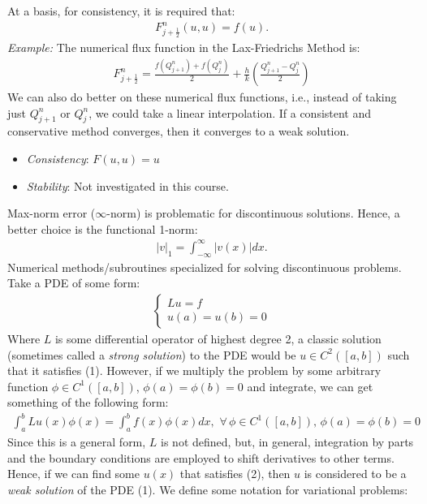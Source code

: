 \documentclass{article}
\begin{document}
At a basis, for consistency, it is required that:
\begin{align*}
  F_{j + \frac{1}{2}}^n (u, u) = f(u).
\end{align*}
\textit{Example:} The numerical flux function in the Lax-Friedrichs Method is:
\begin{align*}
  F_{j+\frac{1}{2}}^n = \frac{f(Q_{j+1}^n) + f(Q_j^n)}{2} + \frac{h}{k} \left(\frac{Q_{j + 1}^n - Q_j^n}{2}\right)
\end{align*}
We can also do better on these numerical flux functions, i.e., instead of taking just $Q_{j+1}^n$ or $Q_j^n$, we could take a linear interpolation.
\pagebreak
{} If a consistent and conservative method converges,
then it converges to a weak solution.
\begin{itemize}
\item \textit{Consistency}: $F(u,u) = u$
\item \textit{Stability}: Not investigated in this course.
\end{itemize}
 Max-norm error ($\infty$-norm) is problematic for discontinuous solutions.
Hence, a better choice is the functional 1-norm:
\begin{align*}
  |v|_1 = \int_{-\infty}^{\infty}|v(x)|dx.
\end{align*}
 Numerical methods/subroutines specialized for solving
discontinuous problems.
\gap
{}
Take a PDE of some form:
\begin{align}
  \begin{cases}
    Lu = f \\
    u(a) = u(b) = 0
  \end{cases}  
\end{align}
Where $L$ is some differential operator of highest degree 2,
a classic solution (sometimes called a \textit{strong solution}) to the PDE would be $u \in C^2([a, b])$ such that it satisfies (1). However, if we multiply the problem by some
arbitrary function $\phi \in C^1([a, b])$, $\phi(a) = \phi(b) = 0$ and integrate, we can
get something of the following form:
\begin{align}
  \int_{a}^{b}Lu(x)\phi(x) = \int_{a}^{b}f(x)\phi(x)dx, \,\, \forall \, \phi \in C^1([a, b]), \, \phi(a) = \phi(b) = 0
\end{align}
Since this is a general form, $L$ is not defined, but, in general, integration by parts
and the boundary conditions are employed to shift derivatives to other terms. Hence, if
we can find some $u(x)$ that satisfies (2), then $u$ is considered to be a \textit{weak solution} of the PDE (1).
\gap
{} We define some notation for variational problems:
\end{document}
